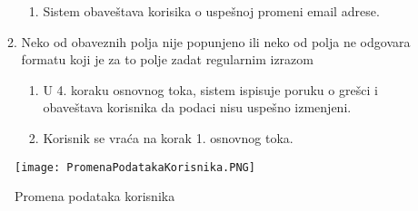 \documentclass[a4paper]{article}
\begin{document}
\begin{itemize}
\begin{enumerate}
\begin{enumerate}
                    \item Sistem obaveštava korisika o uspešnoj promeni email adrese.
                \end{enumerate}
            \item Neko od obaveznih polja nije popunjeno ili neko od polja ne odgovara formatu koji je za to polje zadat regularnim izrazom
                \begin{enumerate}
                    \item U 4. koraku osnovnog toka, sistem ispisuje poruku o grešci i obaveštava korisnika da podaci nisu uspešno izmenjeni.
                    \item Korisnik se vraća na korak 1. osnovnog toka.
                \end{enumerate}
        \end{enumerate}
\end{itemize}


\begin{figure}[hbt!]
    \centering
    \texttt{[image: PromenaPodatakaKorisnika.PNG]}
    \caption{Promena podataka korisnika}
    \label{fig:my_label}
\end{figure}
\end{document}
